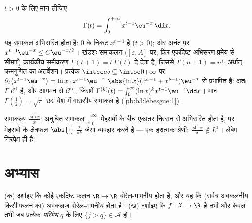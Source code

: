 \begin{example}[गामा फलन]\label{ex:b3:lebesgue:gamma}
$t > 0$ के लिए मान लीजिए
\[
\Gamma(t) = \int_0^{+\infty} x^{t-1}\eu^{-x}\,\dd x .
\]
यह समाकल अभिसरित होता है: $0$ के निकट $x^{t-1}$  है ($t >
0$);
और अनंत पर $x^{t-1}\eu^{-x} \leq C\eu^{-x/2}$। खंडशः समाकलन ($[\varepsilon, A]$ पर, फिर एकदिष्ट अभिसरण
प्रमेय से सीमाएँ) कार्यकीय समीकरण $\Gamma(t + 1) =
t\,\Gamma(t)$ दे देता है, जिससे $\Gamma(n+1) = n!$:
अर्थात् क्रमगुणित का अंतर्वेशन। प्रत्येक $\intcc ab \subseteq \intoo0{+\infty}$ पर $\partial_t\bigl(x^{t-1}\eu^{-x}\bigr) = \ln
x\cdot x^{t-1}\eu^{-x}$ 
$\abs{\ln x}(x^{a-1} +
x^{b-1})\eu^{-x}$ से प्रभावित है: अतः $\Gamma$ $\mathcal C^1$ है, और आगमन से $\mathcal C^\infty$, जिसमें
$\Gamma^{(k)}(t) =
\int_0^\infty(\ln x)^kx^{t-1}\eu^{-x}\dd x$। मान $\Gamma(\frac12) = \sqrt\pi$ छद्म वेश में गाउसीय समाकल है (\cref{pb:b3:lebesgue:1})।
\end{example}

\begin{omfigure}

{\small समाकल्य $\frac{\sin x}x$: अनुचित समाकल $\int_0^\infty$ मेहराबों के बीच एकांतर
निरसन से अभिसरित होता है, पर मेहराबों के क्षेत्रफल $\abs{\cdot}$ $\frac2{\pi k}$
जैसा व्यवहार करते हैं --- एक हरात्मक श्रेणी: $\frac{\sin x}x
\notin L^1$। लेबेग
 निरपेक्ष  ही है।}
\end{omfigure}

\section{अभ्यास}

\begin{exercise}[$\star$]\label{exo:b3:lebesgue:1}
(क) दर्शाइए कि कोई एकदिष्ट फलन $\R \to \R$ बोरेल-मापनीय होता है, और यह
कि (सर्वत्र अवकलनीय किसी फलन का) अवकलज बोरेल-मापनीय होता है।
(ख) दर्शाइए कि $f \colon X \to \R$  है तभी और केवल तभी जब प्रत्येक
\emph{परिमेय} $q$ के लिए $\{f > q\}
\in \mathcal A$ हो।
\end{exercise}

